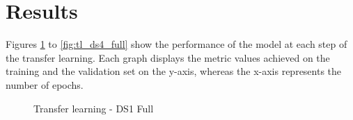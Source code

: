 \section{Results}

\setlength{\marginparwidth}{3cm}\leavevmode {}Figures \ref{fig:tl_ds1_full} to \ref{fig:tl_ds4_full} show the performance of the model at each step of the transfer learning. Each graph displays the metric values achieved on the training and the validation set on the y-axis, whereas the x-axis represents the number of epochs.

\begin{figure}[H]
\centering
\noindent
{}
\caption{Transfer learning - DS1 Full}
\label{fig:tl_ds1_full}
\end{figure}

